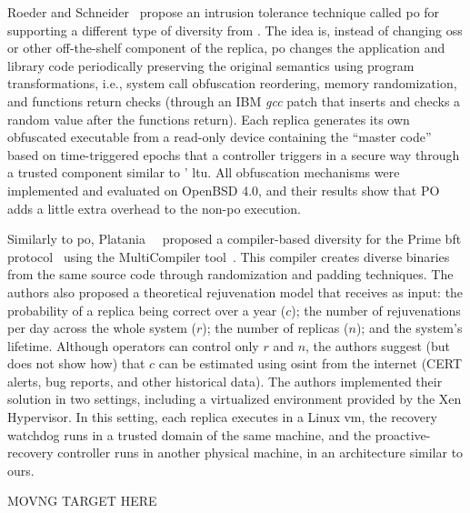 Roeder and Schneider~\cite{Roeder:2010} propose an intrusion tolerance technique called \gls{po} for supporting a different type of diversity from \system.
The idea is, instead of changing \glspl{os} or other off-the-shelf component of the replica, \gls{po} changes the application and library code periodically preserving the original semantics using program transformations, i.e., system call obfuscation reordering, memory randomization, and functions return checks (through an IBM \textit{gcc} patch that inserts and checks a random value after the functions return).
Each replica generates its own obfuscated executable from a read-only device containing the ``master code'' based on time-triggered epochs that a controller triggers in a secure way through a trusted component similar to \system' \gls{ltu}.
All obfuscation mechanisms were implemented and evaluated on OpenBSD 4.0, and their results show that PO adds a little extra overhead to the non-\gls{po} execution.

Similarly to \gls{po}, Platania~\etal{}~\cite{Platania:2014} proposed a compiler-based diversity for the Prime \gls{bft} protocol~\cite{Amir:2011} using the MultiCompiler tool~\cite{Homescu:2013}. 
This compiler creates diverse binaries from the same source code through randomization and padding techniques.
The authors also proposed a theoretical rejuvenation model that receives as input: the probability of a replica being correct over a year ($c$); the number of rejuvenations per day across the whole system ($r$); the number of replicas ($n$); and the system's lifetime. 
Although operators can control only $r$ and $n$, the authors suggest (but does not show how) that $c$ can be estimated using \gls{osint} from the internet (CERT alerts, bug reports, and other historical data).
The authors implemented their solution in two settings, including a virtualized environment provided by the Xen Hypervisor.
In this setting, each replica executes in a Linux \gls{vm}, the recovery watchdog runs in a trusted domain of the same machine, and the proactive-recovery controller runs in another physical machine, in an architecture similar to ours.


MOVNG TARGET HERE

